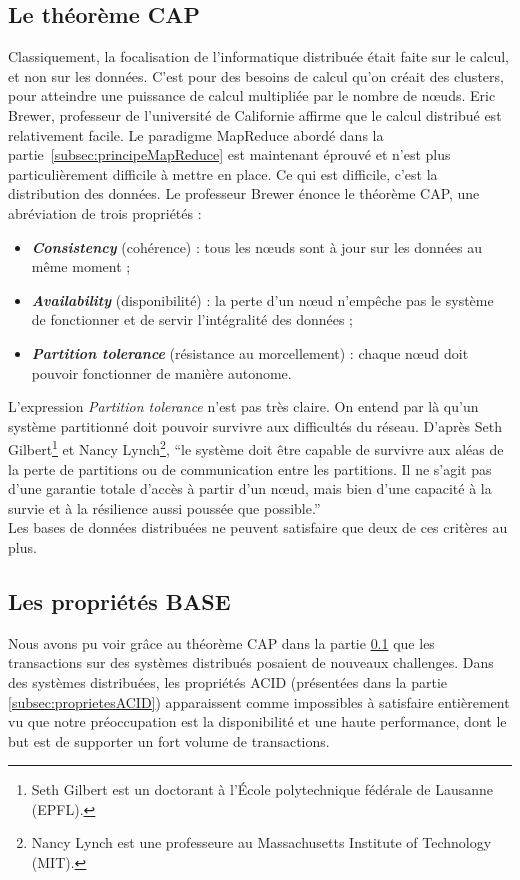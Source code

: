 \subsection{Le théorème CAP}
\label{subsec:theoremeCAP}
	Classiquement, la focalisation de l'informatique distribuée était faite sur le calcul, et non sur les données. C'est pour des besoins de calcul qu'on créait des clusters, pour atteindre une puissance de calcul multipliée par le nombre de nœuds. Eric Brewer, professeur de l'université de Californie affirme que le calcul distribué est relativement facile. Le paradigme MapReduce abordé dans la partie~\ref{subsec:principeMapReduce} est maintenant éprouvé et n'est plus particulièrement difficile à mettre en place. Ce qui est difficile, c'est la distribution des données. Le professeur Brewer énonce le théorème CAP, une abréviation de trois propriétés :
	\vspace{10px}
	\begin{itemize}
		\item \textbf{\textit{Consistency}} (cohérence) : tous les nœuds sont à jour sur les données au même moment ;
		\item \textbf{\textit{Availability}} (disponibilité) : la perte d'un nœud n'empêche pas le système de fonctionner et de servir l'intégralité des données ;
		\item \textbf{\textit{Partition tolerance}} (résistance au morcellement) : chaque nœud doit pouvoir fonctionner de manière autonome.
	\end{itemize}
	\vspace{20px}
	L'expression \textit{Partition tolerance} n'est pas très claire. On entend par là qu'un système partitionné doit pouvoir survivre aux difficultés du réseau. D'après Seth Gilbert\footnote{Seth Gilbert est un doctorant à l'École polytechnique fédérale de Lausanne (EPFL).} et Nancy Lynch\footnote{Nancy Lynch est une professeure au Massachusetts Institute of Technology (MIT).}, \enquote{le système doit être capable de survivre aux aléas de la perte de partitions ou de communication entre les partitions. Il ne s'agit pas d'une garantie totale d'accès à partir d'un nœud, mais bien d'une capacité à la survie et à la résilience aussi poussée que possible.}\\

	Les bases de données distribuées ne peuvent satisfaire que deux de ces critères au plus.

\subsection{Les propriétés BASE}
\label{subsec:proprietesBASE}
	Nous avons pu voir grâce au théorème CAP dans la partie \ref{subsec:theoremeCAP} que les transactions sur des systèmes distribués posaient de nouveaux challenges. Dans des systèmes distribuées, les propriétés ACID (présentées dans la partie \ref{subsec:proprietesACID}) apparaissent comme impossibles à satisfaire entièrement vu que notre préoccupation est la disponibilité et une haute performance, dont le but est de supporter un fort volume de transactions.\\

